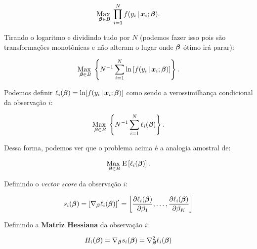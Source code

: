 \documentclass[11pt, oneside, a4paper, article]{article}
\numberwithin{equation}{section}
\begin{document}
\begin{description}
\vspace{-1 em}
\begin{align*}
\underset{\boldsymbol{\beta} \in B}{\text{Max }} 
\prod_{i=1}^{N}
f( y_{i} \, | \, \boldsymbol{x}_{i} ; \boldsymbol{\beta} ).
\end{align*}

\noindent

Tirando o logaritmo e dividindo tudo por $N$ (podemos fazer isso pois são transformações monotônicas e não alteram o lugar onde $\boldsymbol{\beta}$ ótimo irá parar):

\vspace{-1 em}
\begin{align*}
\underset{\boldsymbol{\beta} \in B}{\text{Max }} 
\left\{ 
N^{-1} \sum_{i=1}^{N}
\ln \left[ f( y_{i} \, | \, \boldsymbol{x}_{i} ; \boldsymbol{\beta} ) \right]
\right\}.
\end{align*}

\noindent
Podemos definir
$\ell_{i}( \boldsymbol{\beta} ) = \ln[ f( y_{i} \, | \, \boldsymbol{x}_{i} ; \boldsymbol{\beta} ) ]$
como sendo a verossimilhança condicional da observação $i$:

\vspace{-1 em}
\begin{align*}
\underset{\boldsymbol{\beta} \in B}{\text{Max }} 
\left\{ 
N^{-1} \sum_{i=1}^{N} \ell_{i} (\boldsymbol{\beta})
\right\}.
\end{align*}

Dessa forma, podemos ver que o problema acima é a analogia amostral de:

\vspace{-1 em}
\begin{align*}
\underset{\boldsymbol{\beta} \in B}{\text{Max }} 
\text{E} \left[ 
\ell_{i} ( \boldsymbol{\beta} )
\right].
\end{align*}

Definindo o \textit{vector score} da observação $i$:

\vspace{-1 em}
\begin{align*}
s_{i} (\boldsymbol{\beta}) = 
\left[ \nabla_{\boldsymbol{\beta}} \ell_{i} (\boldsymbol{\beta}) \right]'
=
\begin{bmatrix}
\dfrac{\partial{\ell_{i} (\ensuremath{\boldsymbol{\beta}})}}{\partial{\beta_{1}}},
\dots,
\dfrac{\partial{\ell_{i} (\ensuremath{\boldsymbol{\beta}})}}{\partial{\beta_{K}}}
\end{bmatrix}
\end{align*}

Definindo a \textbf{Matriz Hessiana} da observação $i$:

\vspace{-1 em}
\begin{align*}
H_{i} (\boldsymbol{\beta}) = 
\nabla_{\boldsymbol{\beta}} s_{i} (\boldsymbol{\beta}) = 
\nabla_{\boldsymbol{\beta}}^2 \ell_{i} (\boldsymbol{\beta})
\end{align*}


\end{description}
\end{document}
